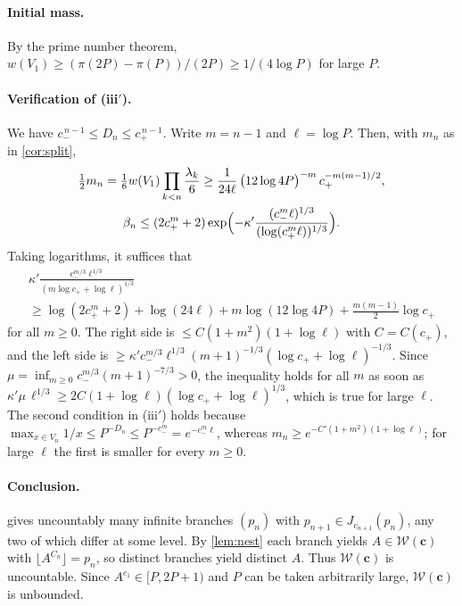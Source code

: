 \documentclass[11pt,a4paper]{article}
\theoremstyle{definition}
\newcommand{\W}{\mathcal{W}}
\newcommand{\fl}[1]{\lfloor #1\rfloor}
\begin{document}
\paragraph{Initial mass.}
By the prime number theorem, $w(V_1)\ge(\pi(2P)-\pi(P))/(2P)\ge1/(4\log P)$ for large $P$.

\paragraph{Verification of (iii$'$).}
We have $c_-^{\,n-1}\le D_n\le c_+^{\,n-1}$. Write $m=n-1$ and $\ell=\log P$. Then, with $m_n$ as in
\cref{cor:split},
\begin{gather*}
 \tfrac12 m_n=\tfrac16w(V_1)\prod_{k<n}\frac{\lambda_k}{6}\ge\frac{1}{24\ell}\,\bigl(12\log 4P\bigr)^{-m}\,c_+^{-m(m-1)/2},\\
 \beta_n\le(2c_+^{m}+2)\exp\Bigl(-\kappa'\frac{(c_-^{m}\ell)^{1/3}}{(\log(c_+^m\ell))^{1/3}}\Bigr).
\end{gather*}
Taking logarithms, it suffices that
\begin{multline*}
 \kappa'\frac{c_-^{m/3}\ell^{1/3}}{(m\log c_++\log\ell)^{1/3}}\\
 \ge\log(2c_+^m+2)+\log(24\ell)+m\log(12\log4P)+\tfrac{m(m-1)}2\log c_+
\end{multline*}
for all $m\ge0$. The right side is $\le C(1+m^2)(1+\log\ell)$ with $C=C(c_+)$, and the left side is
$\ge\kappa' c_-^{m/3}\ell^{1/3}(m+1)^{-1/3}(\log c_++\log\ell)^{-1/3}$. Since
$\mu=\inf_{m\ge0}c_-^{m/3}(m+1)^{-7/3}>0$, the inequality holds for all $m$ as soon as
$\kappa'\mu\,\ell^{1/3}\ge 2C(1+\log\ell)(\log c_++\log\ell)^{1/3}$, which is true for large $\ell$.
The second condition in (iii$'$) holds because $\max_{x\in V_n}1/x\le P^{-D_n}\le P^{-c_-^{m}}=e^{-c_-^m\ell}$,
whereas $m_n\ge e^{-C'(1+m^2)(1+\log\ell)}$; for large $\ell$ the first is smaller for every $m\ge0$.

\paragraph{Conclusion.}
 gives uncountably many infinite branches $(p_n)$ with $p_{n+1}\in J_{c_{n+1}}(p_n)$, any two
of which differ at some level. By \cref{lem:nest} each branch yields $A\in\W(\mathbf c)$ with
$\fl{A^{C_n}}=p_n$, so distinct branches yield distinct $A$. Thus $\W(\mathbf c)$ is uncountable. Since
$A^{c_1}\in[P,2P+1)$ and $P$ can be taken arbitrarily large, $\W(\mathbf c)$ is unbounded.
\end{document}
